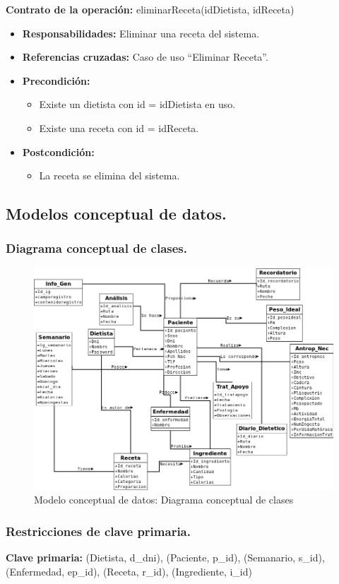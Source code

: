 \textbf{Contrato de la operación:} eliminarReceta(idDietista, idReceta)
\begin{itemize}
\item \textbf{Responsabilidades:} Eliminar una receta del sistema.
\item \textbf{Referencias cruzadas:} Caso de uso ``Eliminar Receta''.
\item \textbf{Precondición:}
\begin{itemize}
\item Existe un dietista con id = idDietista en uso.
\item Existe una receta con id = idReceta.
\end{itemize}
\item \textbf{Postcondición:}
\begin{itemize}
\item La receta se elimina del sistema.
\end{itemize}
\end{itemize}

\subsection{Modelos conceptual de datos.}
\subsubsection{Diagrama conceptual de clases.}
\begin{figure}[H]
  \label{ds_eliminarreceta}
  \begin{center}
    \includegraphics[scale=0.5]{../img/Diagrama_Clases.png}
  \end{center}
  \caption{Modelo conceptual de datos: Diagrama conceptual de clases}
\end{figure}
\subsubsection{Restricciones de clave primaria.}
\textbf{Clave primaria:}
(Dietista, d\_dni),
(Paciente, p\_id),
(Semanario, s\_id),
(Enfermedad, ep\_id),
(Receta, r\_id),
(Ingrediente, i\_id)
